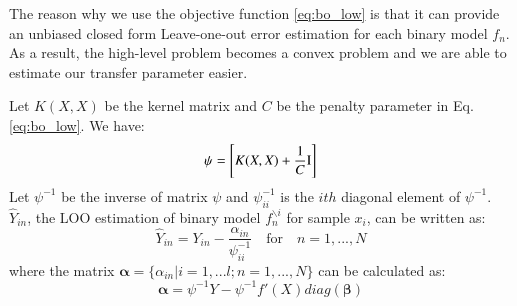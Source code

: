 The reason why we use the objective function \eqref{eq:bo_low} is that it can provide an unbiased closed form Leave-one-out error estimation for each binary model $f_n$\cite{cawley2006leave}. As a result, the high-level problem becomes a convex problem and we are able to estimate our transfer parameter easier.

Let $K(X,X)$ be the kernel matrix and $C$ be the penalty parameter in Eq.\eqref{eq:bo_low}. We have:
\begin{equation}\label{eq:linear}
\psi=\left[ 
{K(X,X) + \frac{1}{C}{\rm{I}}} \right]
\end{equation}
Let $\psi^{-1}$ be the inverse of matrix $\psi$ and  $\psi_{ii}^{-1}$ is the $ith$ diagonal element of $\psi^{-1}$. $\hat{Y}_{in}$, the LOO estimation of binary model $f^{\backslash i}_n$ for sample $x_i$, can be written as\cite{cawley2006leave}:
\begin{equation} \label{eq:loo}
{\hat Y_{in}} = {Y_{in}} - \frac{{{\alpha _{in}}}}{{\psi_{ii}^{ - 1}}}\quad {\text{for}}\quad n = 1,...,N
\end{equation}
where the matrix $\boldsymbol{\alpha}=\{\alpha_{in}|i=1,...l;n=1,...,N\}$ can be calculated as:
\begin{equation}
\boldsymbol{\alpha} =\psi^{-1} Y - \psi^{-1} f'(X)diag(\boldsymbol{\beta})
\end{equation}

